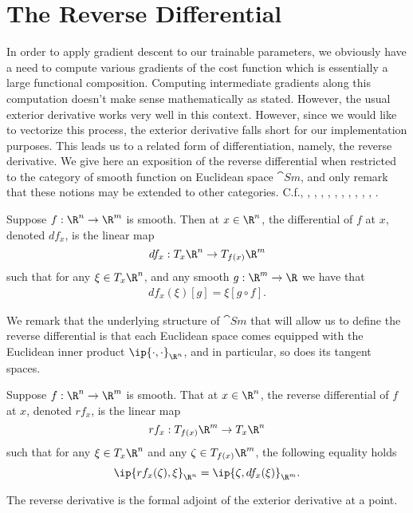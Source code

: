 


\section{The Reverse Differential}

In order to apply gradient descent to our trainable parameters, we obviously have a need to compute various gradients of the cost function which is essentially a large functional composition.  Computing intermediate gradients along this computation doesn't make sense mathematically as stated.  However, the usual exterior derivative works very well in this context.  However, since we would like to vectorize this process, the exterior derivative falls short for our implementation purposes.  This leads us to a related form of differentiation, namely, the reverse derivative.  We give here an exposition of the reverse differential when restricted to the category of smooth function on Euclidean space $\cat{Sm}$, and only remark that these notions may be extended to other categories.  C.f.,  \cite{barendregt1988introduction}, \cite{blute2009cartesian}, \cite{cockett2019reverse}, \cite{cruttwell2022categorical}, \cite{fong2019backprop}, \cite{gavranovic2019compositional},  \cite{mac2013categories}, \cite{mak2020differential}, \cite{selinger2010survey}, \cite{shiebler2021category}, \cite{wengert1964simple}.

\begin{defn}
	Suppose $f:\R^n\to\R^m$ is smooth.  Then at $x\in\R^n$, the differential of $f$ at $x$, denoted $df_x$, is the linear map
	$$df_x:T_x\R^n\to T_{f(x)}\R^m$$
	such that for any $\xi\in T_x\R^n$, and any smooth $g:\R^m\to\R$ we have that
	\begin{align*}
		df_x(\xi)[g]=\xi[g\circ f].
	\end{align*}
\end{defn}

We remark that the underlying structure of $\cat{Sm}$ that will allow us to define the reverse differential is that each Euclidean space comes equipped with the Euclidean inner product $\ip{\cdot,\cdot}_{\R^n}$, and in particular, so does its tangent spaces.

\begin{defn}
	Suppose $f:\R^n\to\R^m$ is smooth.  That at $x\in\R^n$, the reverse differential of $f$ at $x$, denoted $rf_x$, is the linear map
	$$rf_x:T_{f(x)}\R^m\to T_x\R^n$$
	such that for any $\xi\in T_x\R^n$ and any $\zeta\in T_{f(x)}\R^m$, the following equality holds
	$$\ip{rf_x(\zeta),\xi}_{\R^n}=\ip{\zeta,df_x(\xi)}_{\R^m}.$$
	
	The reverse derivative is the formal adjoint of the exterior derivative at a point.
\end{defn}

